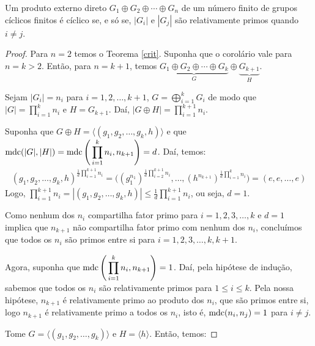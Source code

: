 	\begin{corollary}
		\label{C1}
		Um produto externo direto $G_1\oplus G_2\oplus\cdots\oplus G_n$ de um número finito de grupos cíclicos finitos é cíclico se, e só se, $|G_i|$ e $|G_j|$ são relativamente primos quando $i\neq j$.
	\end{corollary}
	
	\begin{proof}
		Para $n = 2$ temos o Teorema \eqref{crit}. Suponha que o corolário vale para $n = k>2$. Então, para $n = k+1$, temos $\underbrace{G_1\oplus G_2\oplus\cdots\oplus G_k }_{G}\oplus\underbrace{ G_{k+1}}_{H}$. 
		\par\vspace{0.3cm} Sejam $|G_i| = n_i$ para $i = 1, 2, \dots , k + 1$, $\displaystyle{G = \bigoplus_{i=1}^{k}G_i}$ de modo que $\displaystyle{|G| = \prod_{i =1}^{k}n_i}$ e $H = G_{k+1}$. Daí, $\displaystyle{|G\oplus H| = \prod_{i = 1}^{k+1}n_i}$. 
		\par\vspace{0.3cm} Suponha que $G\oplus H = \langle (g_1, g_2, \dots , g_k, h) \rangle$ e que $\displaystyle{\operatorname{mdc}(|G|, |H|)= \operatorname{mdc}\Bigg(\prod_{i = 1}^{k}n_i, n_{k+1}\Bigg) = d}$. Daí, temos:
		\begin{align*}
		(g_1, g_2, \dots, g_k, h)^{\displaystyle{\frac{1}{d}\prod_{i=1}^{k+1}n_i}} = \Bigg((g_1^{n_1})^{\displaystyle{\frac{1}{d}\prod_{i=2}^{k+1}n_i}}  ,\dots, (h^{n_{k+1}})^{\displaystyle{\frac{1}{d}\prod_{i = 1}^{k}n_i}} \Bigg) = (e, e, \dots, e)
		\end{align*}
		Logo, $\displaystyle{ \prod_{i=1}^{k+1}n_i = |(g_1, g_2,\dots, g_k, h)| \leq \frac{1}{d}\prod_{i=1}^{k+1}n_i }$, ou seja, $d = 1$.
		\par\vspace{0.3cm} Como nenhum dos $n_i$ compartilha fator primo para $i = 1, 2, 3, \dots, k$ e $d = 1$ implica que $n_{k+1}$ não compartilha fator primo com nenhum dos $n_i$, concluímos que todos os $n_i$ são primos entre si para $i = 1, 2, 3, \dots, k, k+1$.
		\par\vspace{0.3cm} Agora, suponha que $\displaystyle{\operatorname{mdc}\Bigg(\prod_{i=1}^{k}n_i , n_{k+1}\Bigg)} = 1$. Daí, pela hipótese de indução, sabemos que todos os $n_i$ são relativamente primos para $1\leq i\leq k$. Pela nossa hipótese, $n_{k+1}$ é relativamente primo ao produto dos $n_i$, que são primos entre si, logo $n_{k+1}$ é relativamente primo a todos os $n_i$, isto é, 
		$\operatorname{mdc}(n_i, n_j) = 1$ para $i\neq j$. 
		\par\vspace{0.3cm} Tome $G = \langle (g_1, g_2, \dots, g_k) \rangle$ e $H = \langle h \rangle$. Então, temos:

\end{proof}
